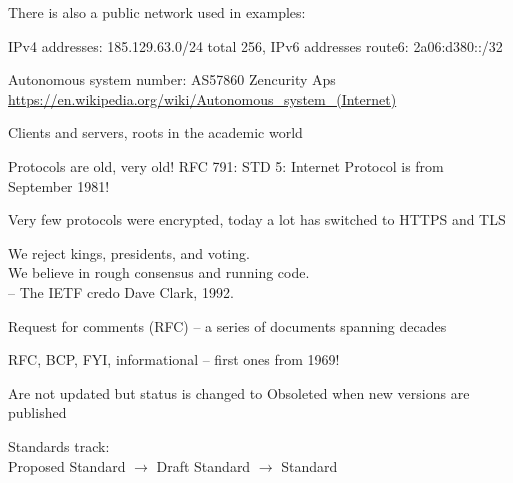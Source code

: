 \documentclass[Screen16to9,17pt]{foils}
\begin{document}
There is also a public network used in examples:
\begin{list2}
\item IPv4 addresses: 185.129.63.0/24 total 256, IPv6 addresses route6: 2a06:d380::/32
\item Autonomous system number: AS57860 Zencurity Aps\\
\url{https://en.wikipedia.org/wiki/Autonomous_system_(Internet)}
\end{list2}





\begin{list1}
\item Clients and servers, roots in the academic world
\item Protocols are old, very old! RFC 791: STD 5: Internet Protocol is from  September 1981!
\item Very few protocols were encrypted, today a lot has switched to HTTPS and TLS
\end{list1}


{\hlkbig \color{titlecolor}
We reject kings, presidents, and voting.\\
We believe in rough consensus and running code.\\
-- The IETF credo Dave Clark, 1992.}

\begin{list1}
\item Request for comments (RFC) -- a series of documents spanning decades
\item RFC, BCP, FYI, informational -- first ones from 1969!
\item Are not updated but status is changed to Obsoleted when new versions are published
\item Standards track:\\
Proposed Standard $\rightarrow$ Draft Standard $\rightarrow$ Standard
\end{list1}

\end{document}
